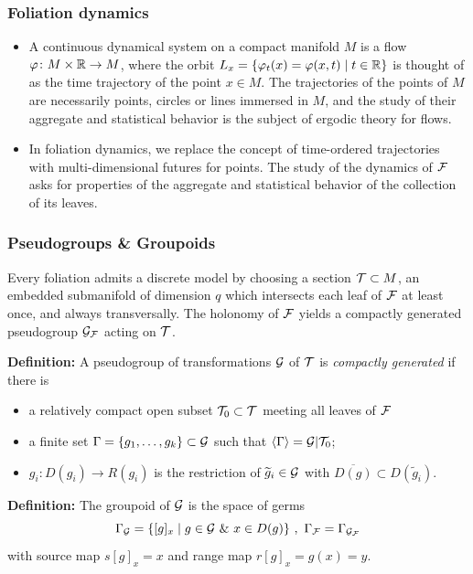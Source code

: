 \documentclass{beamer}
\begin{document}
 
\frame
{

  \frametitle{Foliation dynamics}

\begin{itemize}

 

\item
A continuous dynamical system on a compact manifold $M$ is a flow $\varphi \colon M \times {\mathbb R} \to M$, where the orbit $L_x = \{\varphi_t(x) = \varphi(x,t) \mid t \in {\mathbb R}\}$ is thought of as the time trajectory of the point $x \in M$.  The trajectories of the points of $M$ are necessarily points, circles or lines immersed in $M$, and the study of their aggregate and statistical behavior is the subject of ergodic theory for flows.

 \bigskip
 

\item
In foliation dynamics, we replace the concept of time-ordered trajectories with multi-dimensional futures for points. The study of the dynamics of ${\mathcal F}$  asks for properties of the    aggregate and statistical behavior of the collection of its leaves.

\end{itemize}
\bigskip


\vfill

}


   
  

\frame
{

  \frametitle{Pseudogroups \& Groupoids}
  
  

Every foliation admits a discrete model by choosing a section ${\mathcal T} \subset M$, an embedded submanifold of dimension $q$ which intersects each leaf of ${\mathcal F}$ at least once, and always transversally.  The holonomy of ${\mathcal F}$ yields a compactly generated pseudogroup ${\mathcal G}_{{\mathcal F}}$ acting on ${\mathcal T}$.

\bigskip

 
 {\bf Definition:}
A     pseudogroup of transformations ${\mathcal G}$ of ${\mathcal T}$ is \emph{compactly generated}     if there is 
\begin{itemize}
\item   a relatively compact open subset ${\mathcal T}_0 \subset {\mathcal T}$ meeting all leaves of ${\mathcal F}$
\item  a finite set $\Gamma = \{g_1, \ldots , g_k\} \subset    {\mathcal G}$  such that $\langle \Gamma \rangle =  {\mathcal G} | {\mathcal T}_0$; 
\item   $g_i \colon D({g_i}) \to R({g_i})$ is the restriction of  $\widetilde{g}_i \in   {\mathcal G}$ with   
$\overline{D(g)} \subset D({\widetilde{g}_i})$.
\end{itemize}

\pause
 
\bigskip

{\bf Definition:} The groupoid of ${\mathcal G}$ is the space of germs 
$$\Gamma_{{\mathcal G}} = \{[g]_x \mid g \in {\mathcal G} ~ \& ~ x \in D(g)\} ~ , ~ \Gamma_{{\mathcal F}} = \Gamma_{{\mathcal G}_{{\mathcal F}}}  $$
with source map $s[g]_x = x$ and range map $r[g]_x = g(x) = y$.



  \vfill

}
\end{document}
